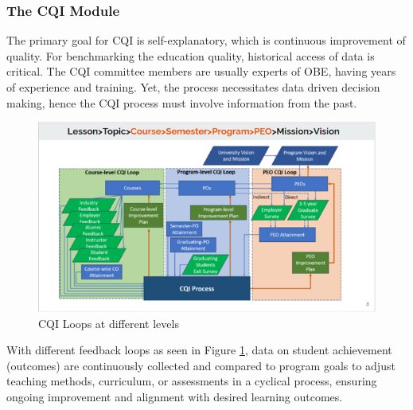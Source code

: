 \documentclass[journal,onecolumn]{IEEEtran}
\begin{document}
\subsubsection{\textbf{The CQI Module}}
\vspace{12pt}

The primary goal for CQI is self-explanatory, which is continuous improvement of quality. For benchmarking the education quality, historical access of data is critical. The CQI committee members are usually experts of OBE, having years of experience and training. Yet, the process necessitates data driven decision making, hence the CQI process must involve information from the past. 

\begin{figure}
    \centering
    \includegraphics[width=0.8\linewidth]{img/Picture7.png}
    \caption{CQI Loops at different levels}
    \label{fig:cqi-loops}
\end{figure}
With different feedback loops as seen in Figure \ref{fig:cqi-loops}, data on student achievement (outcomes) are continuously collected and compared to program goals to adjust teaching methods, curriculum, or assessments in a cyclical process, ensuring ongoing improvement and alignment with desired learning outcomes.
\end{document}
